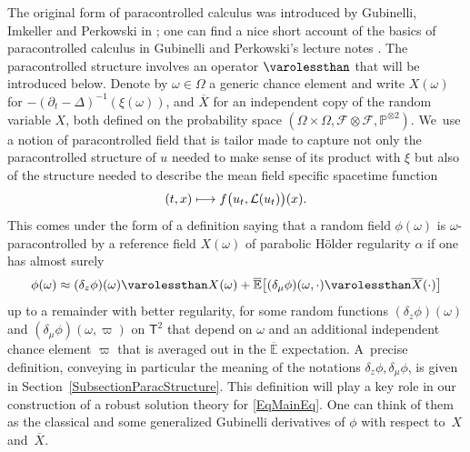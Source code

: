 \documentclass[10pt]{amsart}
\newcommand\mto{\mathchoice{\longmapsto}{\mapsto}{\mapsto}{\mapsto}}
\theoremstyle{definition}
\newcommand\bbE{\mathbb{E}}
\newcommand{\bsfT}{\mathbf{\mathsf{T}}}
\newcommand{\mcF}{\mathcal{F}}
\newcommand{\mcL}{\mathcal{L}}
\newcommand{\bbP}{\mathbb{P}}
\begin{document}
The original form of paracontrolled calculus was introduced by Gubinelli, Imkeller and Perkowski in \cite{GIP}; one can find a nice short account of the basics of paracontrolled calculus in Gubinelli and Perkowski's lecture notes \cite{GPEnsaios}. The paracontrolled structure involves an operator $\varolessthan$ that will be introduced below. Denote by $\omega\in\Omega$ a generic chance element and write $X(\omega)$ for $-(\partial_t-\Delta)^{-1}(\xi(\omega))$, and $\overline{X}$ for an independent copy of the random variable $X$, both defined on the probability space $(\Omega\times\Omega,\mcF\otimes\mcF,\bbP^{\otimes 2})$. We~use a notion of paracontrolled field that is tailor made to capture not only the paracontrolled structure of $u$ needed to make sense of its product with $\xi$ but also of the structure needed to describe the mean field specific spacetime function
\[
(t,x)\mto f\bigl(u_t,\mcL(u_t)\bigr)(x).
\]
This comes under the form of a definition saying that a random field $\phi(\omega)$ is $\omega$\nobreakdash-paracontrolled by a reference field $X(\omega)$ of parabolic Hölder regularity $\alpha$ if one has almost surely
\begin{equation} \label{EqDefnOmegaPC}
\phi(\omega) \approx (\delta_z \phi)(\omega) \varolessthan X(\omega) + \overline{\bbE}\bigl[(\delta_\mu \phi)(\omega,\cdot) \varolessthan \overline{X}(\cdot)\bigr]
\end{equation}
up to a remainder with better regularity, for some random functions $(\delta_z \phi)(\omega)$ and $(\delta_\mu \phi)(\omega,\varpi)$ on $\bsfT^2$ that depend on $\omega$ and an additional independent chance element $\varpi$ that is averaged out in the $\overline{\bbE}$ expectation. A~precise definition, conveying in particular the meaning of the notations $\delta_z\phi, \delta_\mu \phi$, is given in Section~\ref{SubsectionParacStructure}. This definition will play a key role in our construction of a robust solution theory for \eqref{EqMainEq}. One can think of them as the classical and some generalized Gubinelli derivatives of $\phi$ with respect to~$X$ and~$\overline{X}$.
\end{document}
